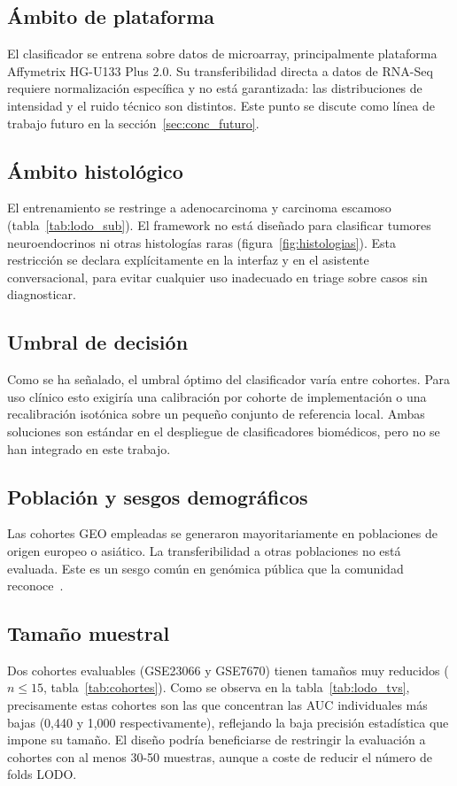 \subsection{Ámbito de plataforma}
El clasificador se entrena sobre datos de microarray, principalmente
plataforma Affymetrix HG-U133 Plus 2.0. Su transferibilidad directa a
datos de RNA-Seq requiere normalización específica y no está garantizada:
las distribuciones de intensidad y el ruido técnico son distintos. Este
punto se discute como línea de trabajo futuro en la
sección~\ref{sec:conc_futuro}.

\subsection{Ámbito histológico}
El entrenamiento se restringe a adenocarcinoma y carcinoma escamoso
(tabla~\ref{tab:lodo_sub}). El framework no está diseñado para clasificar
tumores neuroendocrinos ni otras histologías raras
(figura~\ref{fig:histologias}). Esta restricción se declara explícitamente
en la interfaz y en el asistente conversacional, para evitar cualquier uso
inadecuado en triage sobre casos sin diagnosticar.

\subsection{Umbral de decisión}
Como se ha señalado, el umbral óptimo del clasificador varía entre
cohortes. Para uso clínico esto exigiría una calibración por cohorte de
implementación o una recalibración isotónica sobre un pequeño conjunto
de referencia local. Ambas soluciones son estándar en el despliegue de
clasificadores biomédicos, pero no se han integrado en este trabajo.

\subsection{Población y sesgos demográficos}
Las cohortes GEO empleadas se generaron mayoritariamente en poblaciones de
origen europeo o asiático. La transferibilidad a otras poblaciones no
está evaluada. Este es un sesgo común en genómica pública que la
comunidad reconoce~\cite{sirugo2019missing}.

\subsection{Tamaño muestral}
Dos cohortes evaluables (GSE23066 y GSE7670) tienen tamaños muy reducidos
($n \leq 15$, tabla~\ref{tab:cohortes}). Como se observa en la
tabla~\ref{tab:lodo_tvs}, precisamente estas cohortes son las que
concentran las AUC individuales más bajas (0,440 y 1,000 respectivamente),
reflejando la baja precisión estadística que impone su tamaño. El diseño
podría beneficiarse de restringir la evaluación a cohortes con al menos
30-50 muestras, aunque a coste de reducir el número de folds LODO.

